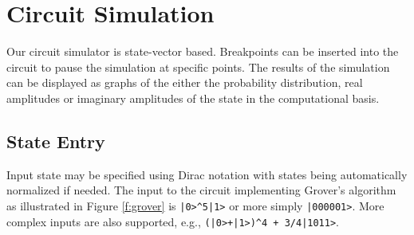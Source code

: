 \documentclass[aps,prl,reprint,floatfix,superscriptaddress]{revtex4-1} %
\begin{document}
\section{Circuit Simulation}
Our circuit simulator is state-vector based.
Breakpoints can be inserted into the circuit to pause the simulation at specific points.
The results of the simulation can be displayed as graphs of the either the probability distribution, real amplitudes or imaginary amplitudes of the state in the computational basis.
\subsection{State Entry}
Input state may be specified using Dirac notation with states being automatically normalized if needed.
The input to the circuit implementing Grover's algorithm as illustrated in Figure \ref{f:grover} is \verb$|0>^5|1>$ or more simply \verb$|000001>$. 
More complex inputs are also supported, e.g., \verb$(|0>+|1>)^4 + 3/4|1011>$.



\end{document}
